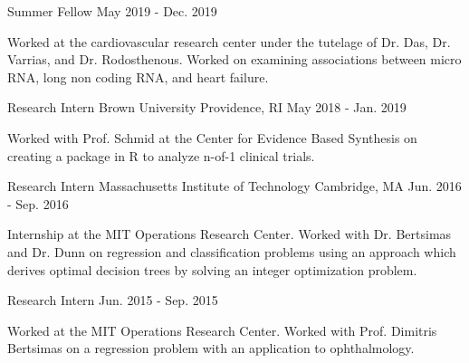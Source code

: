 \begin{cventries}
\vspace{-1mm}
  \cventry
    {Summer Fellow} %
    {} %
    {} %
    {May 2019 - Dec. 2019} %
    {
      \begin{cvitems} %
        \item {Worked at the cardiovascular research center under the tutelage of Dr. Das, Dr. Varrias, and Dr. Rodosthenous. Worked on examining associations between micro RNA, long non coding RNA, and heart failure.}
      \end{cvitems}
    }

\vspace{-1mm}
  \cventry
    {Research Intern} %
    {Brown University} %
    {Providence, RI} %
    {May 2018 - Jan. 2019} %
    {
      \begin{cvitems} %
        \item {Worked with Prof. Schmid at the Center for Evidence Based Synthesis on creating a package in R to analyze n-of-1 clinical trials.}
      \end{cvitems}
    }

\vspace{-1mm}
  \cventry
    {Research Intern} %
    {Massachusetts Institute of Technology} %
    {Cambridge, MA} %
    {Jun. 2016 - Sep. 2016} %
    {
      \begin{cvitems} %
        \item {Internship at the MIT Operations Research Center. Worked with Dr. Bertsimas and Dr. Dunn on regression and classification problems using an approach which derives optimal decision trees by 
  solving an integer optimization problem.}
      \end{cvitems}
    }

\vspace{-1mm}
  \cventry
    {Research Intern} %
    {} %
    {} %
    {Jun. 2015 - Sep. 2015} %
    {
      \begin{cvitems} %
        \item {Worked at the MIT Operations Research Center. Worked with Prof. Dimitris Bertsimas on a regression problem with an application to ophthalmology.}
      \end{cvitems}
    }

\end{cventries}

